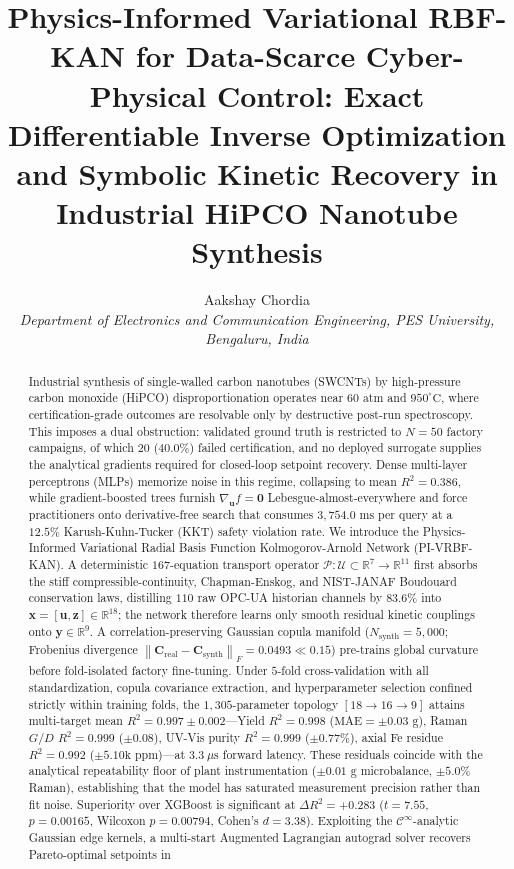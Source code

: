 \documentclass[10pt,journal,onecolumn]{IEEEtran}
\begin{document}
\title{Physics-Informed Variational RBF-KAN for Data-Scarce Cyber-Physical Control: Exact Differentiable Inverse Optimization and Symbolic Kinetic Recovery in Industrial HiPCO Nanotube Synthesis}
\author{Aakshay Chordia\\ \textit{Department of Electronics and Communication Engineering, PES University, Bengaluru, India}}
\maketitle
\begin{abstract}
Industrial synthesis of single-walled carbon nanotubes (SWCNTs) by high-pressure carbon monoxide (HiPCO) disproportionation operates near $60\text{ atm}$ and $950^\circ\text{C}$, where certification-grade outcomes are resolvable only by destructive post-run spectroscopy. This imposes a dual obstruction: validated ground truth is restricted to $N = 50$ factory campaigns, of which $20$ ($40.0\%$) failed certification, and no deployed surrogate supplies the analytical gradients required for closed-loop setpoint recovery. Dense multi-layer perceptrons (MLPs) memorize noise in this regime, collapsing to mean $R^2 = 0.386$, while gradient-boosted trees furnish $\nabla_{\mathbf{u}} f = \mathbf{0}$ Lebesgue-almost-everywhere and force practitioners onto derivative-free search that consumes $3,754.0\text{ ms}$ per query at a $12.5\%$ Karush-Kuhn-Tucker (KKT) safety violation rate. We introduce the Physics-Informed Variational Radial Basis Function Kolmogorov-Arnold Network (PI-VRBF-KAN). A deterministic $167$-equation transport operator $\mathcal{P}: \mathcal{U} \subset \mathbb{R}^7 \to \mathbb{R}^{11}$ first absorbs the stiff compressible-continuity, Chapman-Enskog, and NIST-JANAF Boudouard conservation laws, distilling $110$ raw OPC-UA historian channels by $83.6\%$ into $\mathbf{x} = [\mathbf{u}, \mathbf{z}] \in \mathbb{R}^{18}$; the network therefore learns only smooth residual kinetic couplings onto $\mathbf{y} \in \mathbb{R}^9$. A correlation-preserving Gaussian copula manifold ($N_{\text{synth}} = 5,000$; Frobenius divergence $\left\|\mathbf{C}_{\text{real}} - \mathbf{C}_{\text{synth}}\right\|_F = 0.0493 \ll 0.15$) pre-trains global curvature before fold-isolated factory fine-tuning. Under $5$-fold cross-validation with all standardization, copula covariance extraction, and hyperparameter selection confined strictly within training folds, the $1,305$-parameter topology $[18 \to 16 \to 9]$ attains multi-target mean $R^2 = 0.997 \pm 0.002$—Yield $R^2 = 0.998$ ($\text{MAE} = \pm 0.03\text{ g}$), Raman $G/D$ $R^2 = 0.999$ ($\pm 0.08$), UV-Vis purity $R^2 = 0.999$ ($\pm 0.77\%$), axial Fe residue $R^2 = 0.992$ ($\pm 5.10\text{k ppm}$)—at $3.3\ \mu\text{s}$ forward latency. These residuals coincide with the analytical repeatability floor of plant instrumentation ($\pm 0.01\text{ g}$ microbalance, $\pm 5.0\%$ Raman), establishing that the model has saturated measurement precision rather than fit noise. Superiority over XGBoost is significant at $\Delta R^2 = +0.283$ ($t = 7.55$, $p = 0.00165$, Wilcoxon $p = 0.00794$, Cohen's $d = 3.38$). Exploiting the $\mathcal{C}^\infty$-analytic Gaussian edge kernels, a multi-start Augmented Lagrangian autograd solver recovers Pareto-optimal setpoints in 
\end{abstract}
\end{document}
